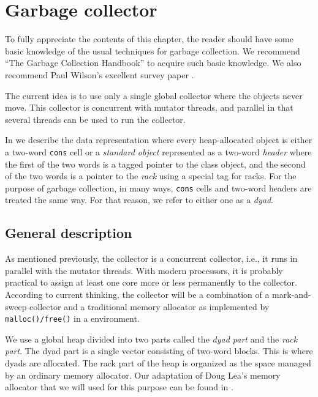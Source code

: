 \chapter{Garbage collector}

To fully appreciate the contents of this chapter, the reader should
have some basic knowledge of the usual techniques for garbage
collection.  We recommend ``The Garbage Collection Handbook''
\cite{Jones:2011:GCH:2025255} to acquire such basic knowledge.  We
also recommend Paul Wilson's excellent survey paper
\cite{Wilson:1992:UGC:645648.664824}.

The current idea is to use only a single global collector where the
objects never move.  This collector is concurrent with mutator
threads, and parallel in that several threads can be used to run the
collector.

In  we describe the data
representation where every heap-allocated object is either a two-word
\texttt{cons} cell or a \emph{standard object} represented as a
two-word \emph{header} where the first of the two words is a tagged
pointer to the class object, and the second of the two words is a
pointer to the \emph{rack} using a special tag for racks.  For the
purpose of garbage collection, in many ways, \texttt{cons} cells and
two-word headers are treated the same way.  For that reason, we refer
to either one as a \emph{dyad}.

\section{General description}

As mentioned previously, the collector is a concurrent collector,
i.e., it runs in parallel with the mutator threads.  With modern
processors, it is probably practical to assign at least one core more
or less permanently to the collector.  According to current
thinking, the collector will be a combination of a
mark-and-sweep collector and a traditional memory allocator as
implemented by \texttt{malloc()/free()} in a \clanguage{} environment.

We use a global heap divided into two parts called the \emph{dyad
  part} and the \emph{rack part}.  The dyad part is a single vector
consisting of two-word blocks.  This is where dyads are allocated.
The rack part of the heap is organized as the space managed by
an ordinary memory allocator.  Our adaptation of Doug Lea's memory
allocator that we will used for this purpose can be found in
.

